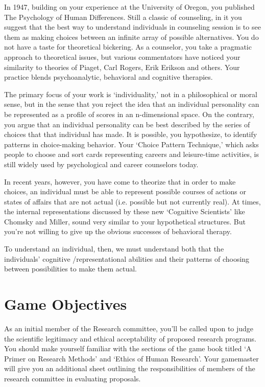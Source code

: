 In 1947, building on your experience at the University of Oregon, you published The Psychology of Human Differences. Still a classic of counseling, in it you suggest that the best way to understand individuals in counseling session is to see them as making choices between an infinite array of possible alternatives. You do not have a taste for theoretical bickering. As a counselor, you take a pragmatic approach to theoretical issues, but various commentators have noticed your similarity to theories of Piaget, Carl Rogers, Erik Erikson and others. Your practice blends psychoanalytic, behavioral and cognitive therapies.

The primary focus of your work is `individuality,' not in a philosophical or moral sense, but in the sense that you reject the idea that an individual personality can be represented as a profile of scores in an n-dimensional space. On the contrary, you argue that an individual personality can be best described by the series of choices that that individual has made. It is possible, you hypothesize, to identify patterns in choice-making behavior. Your `Choice Pattern Technique,' which asks people to choose and sort cards representing careers and leisure-time activities, is still widely used by psychological and career counselors today.

In recent years, however, you have come to theorize that in order to make choices, an individual must be able to represent possible courses of actions or states of affairs that are not actual (i.e. possible but not currently real). At times, the internal representations discussed by these new `Cognitive Scientists' like Chomsky and Miller, sound very similar to your hypothetical structures. But you're not willing to give up the obvious successes of behavioral therapy.

To understand an individual, then, we must understand both that the individuals' cognitive \slash  representational abilities and their patterns of choosing between possibilities to make them actual.

\section{Game Objectives}
\label{gameobjectives}

As an initial member of the Research committee, you'll be called upon to judge the scientific legitimacy and ethical acceptability of proposed research programs. You should make yourself familiar with the sections of the game book titled `A Primer on Research Methods' and `Ethics of Human Research'. Your gamemaster will give you an additional sheet outlining the responsibilities of members of the research committee in evaluating proposals.

